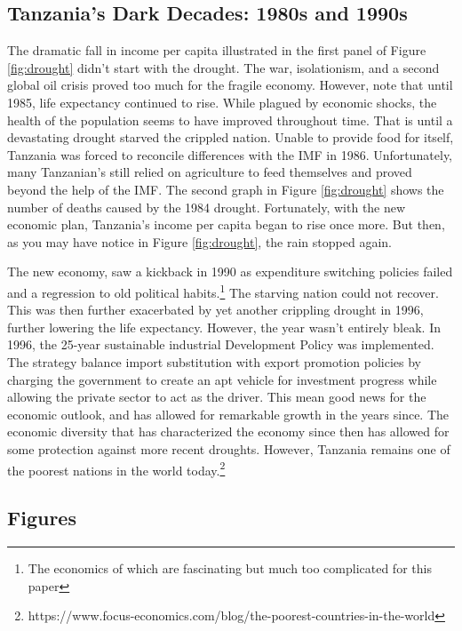 \documentclass[12pt]{article}
\begin{document}
\subsection*{Tanzania's Dark Decades: 1980s and 1990s} 
The dramatic fall in income per capita illustrated in the first panel of Figure \ref{fig:drought} didn't start with the drought. The war, isolationism, and a second global oil crisis proved too much for the fragile economy. However, note that until 1985, life expectancy continued to rise. While plagued by economic shocks, the health of the population seems to have improved throughout time. That is until a devastating drought starved the crippled nation. Unable to provide food for itself, Tanzania was forced to reconcile differences with the IMF in 1986. Unfortunately, many Tanzanian's still relied on agriculture to feed themselves and proved beyond the help of the IMF. The second graph in Figure \ref{fig:drought} shows the number of deaths caused by the 1984 drought. Fortunately, with the new economic plan, Tanzania's income per capita began to rise once more. But then, as you may have notice in Figure \ref{fig:drought}, the rain stopped again. 

The new economy, saw a kickback in 1990 as expenditure switching policies failed and a regression to old political habits.\footnote{The economics of which are fascinating but much too complicated for this paper} The starving nation could not recover. This was then further exacerbated by yet another crippling drought in 1996, further lowering the life expectancy. However, the year wasn't entirely bleak. In 1996, the 25-year sustainable industrial Development Policy was implemented. The strategy balance import substitution with export promotion policies by charging the government to create an apt vehicle for investment progress while allowing the private sector to act as the driver. This mean good news for the economic outlook, and has allowed for remarkable growth in the years since. The economic diversity that has characterized the economy since then has allowed for some protection against more recent droughts. However, Tanzania remains one of the poorest nations in the world today.\footnote{https://www.focus-economics.com/blog/the-poorest-countries-in-the-world}
\newpage
\subsection*{Figures}
\end{document}
